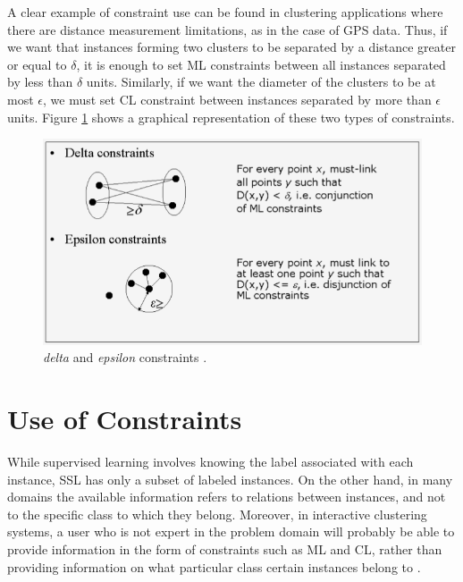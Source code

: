 A clear example of constraint use can be found in clustering applications where there are distance measurement limitations, as in the case of \acs{GPS} data. Thus, if we want that instances forming two clusters to be separated by a distance greater or equal to $\delta$, it is enough to set \acs{ML} constraints between all instances separated by less than $\delta$ units. Similarly, if we want the diameter of the clusters to be at most $\epsilon$, we must set \acs{CL} constraint between instances separated by more than $\epsilon$ units. Figure \ref{fig:DistanceConstraints} shows a graphical representation of these two types of constraints.

\begin{figure}[!h]
	\centering
	\includegraphics[scale=0.45]{gfx/ConstClust/RestriccionesDeltaEpsilon.png} 
	\caption[\textit{delta} and \textit{epsilon} constraints]{\textit{delta} and \textit{epsilon} constraints \cite{davidson2007survey}.}\label{fig:DistanceConstraints}
\end{figure}


\section{Use of Constraints} \label{sec:ConstUse}

While supervised learning involves knowing the label associated with each instance, \acs{SSL} has only a subset of labeled instances. On the other hand, in many domains the available information refers to relations between instances, and not to the specific class to which they belong. Moreover, in interactive clustering systems, a user who is not expert in the problem domain will probably be able to provide information in the form of constraints such as \acs{ML} and \acs{CL}, rather than providing information on what particular class certain instances belong to \cite{cohn2003semi,davidson2007hierarchical}.

